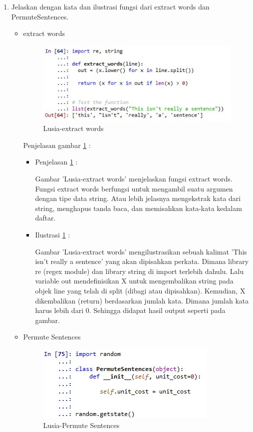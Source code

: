 \begin{enumerate}
\item Jelaskan dengan kata dan ilustrasi fungsi dari extract words dan PermuteSentences. 
	\begin{itemize}
		\item extract words 
			\begin{figure}[!hbtp]
			\centering
			\includegraphics[scale=0.5]{figures/q2a.jpg}
			\caption{Lusia-extract words}
			\label{5b14}
			\end{figure}
			\par Penjelasan gambar \ref{5b14} : 
			\begin{itemize}
				\item Penjelasan \ref{5b14} : 
					\par Gambar 'Lusia-extract words' menjelaskan fungsi extract words. Fungsi extract words berfungsi untuk mengambil suatu argumen dengan tipe data string. Atau lebih jelasnya mengekstrak kata dari string, menghapus tanda baca, dan memisahkan kata-kata kedalam daftar.
				\item Ilustrasi \ref{5b14} : 
					\par Gambar 'Lusia-extract words' mengilustrasikan sebuah kalimat 'This isn't really a sentence' yang  akan dipisahkan perkata. Dimana library re (regex module) dan library string di import terlebih dahulu. Lalu variable out mendefinisikan X untuk mengembalikan string pada objek line yang telah di split (dibagi atau dipisahkan). Kemudian, X dikembalikan (return) berdasarkan jumlah kata. Dimana jumlah kata harus lebih dari 0. Sehingga didapat hasil output seperti pada gambar.
			\end{itemize}
			
			
		\item Permute Sentences
			\begin{figure}[!hbtp]
			\centering
			\includegraphics[scale=0.5]{figures/q2b.jpg}
			\caption{Lusia-Permute Sentences}
			\label{5b15}
			\end{figure}
			

\end{itemize}
\end{enumerate}
